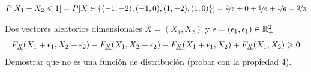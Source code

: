 \begin{ejercicio}
\begin{center}
    \end{center}

    \begin{gather*}
        P[X_1+X_2 \leq 1] = P[X\in \{(-1,-2), (-1,0), (1, -2), (1,0)\}] = \nicefrac{2}{6} + 0 + \nicefrac{1}{6} + \nicefrac{1}{6} = \nicefrac{2}{3}
    \end{gather*}
    
\end{ejercicio}
\hspace{0.5cm}
\begin{ejemplo}
    Dos vectores aleatorios dimensionales $X=(X_1, X_2)$ y $\eps = (\eps_1, \eps_1) \in \bb{R}^2_+$
    \begin{gather*}
        F_{\underline{X}}(X_1 + \eps_1, X_2+\eps_2) - F_{\underline{X}}(X_1, X_2+\eps_2) - F_{\underline{X}}(X_1 + \eps_1, X_2) + F_{\underline{X}}(X_1, X_2) \geq 0
    \end{gather*}
    Demostrar que no es una función de distribución (probar con la propiedad 4).
\end{ejemplo}
